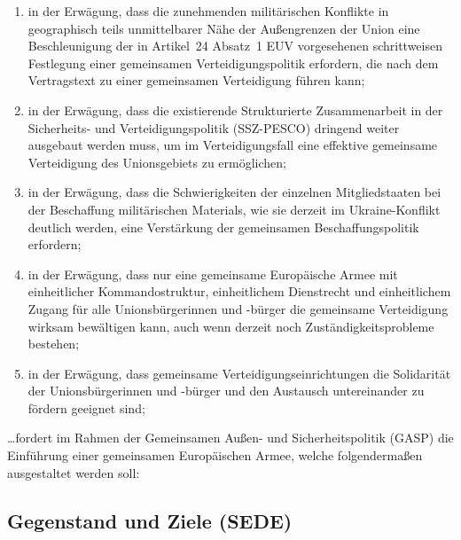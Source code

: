 \documentclass[12pt,a4paper]{article}
\begin{document}
\begin{enumerate}[label=\Alph*., leftmargin=2em, itemsep=8pt]
    \item in der Erwägung, dass die zunehmenden militärischen Konflikte in geographisch
    teils unmittelbarer Nähe der Außengrenzen der Union eine Beschleunigung der in
    Artikel~24 Absatz~1 EUV vorgesehenen schrittweisen Festlegung einer gemeinsamen
    Verteidigungspolitik erfordern, die nach dem Vertragstext zu einer gemeinsamen
    Verteidigung führen kann;

    \item in der Erwägung, dass die existierende Strukturierte Zusammenarbeit in der
    Sicherheits- und Verteidigungspolitik (SSZ-PESCO) dringend weiter ausgebaut werden
    muss, um im Verteidigungsfall eine effektive gemeinsame Verteidigung des
    Unionsgebiets zu ermöglichen;

    \item in der Erwägung, dass die Schwierigkeiten der einzelnen Mitgliedstaaten bei der
    Beschaffung militärischen Materials, wie sie derzeit im Ukraine-Konflikt deutlich
    werden, eine Verstärkung der gemeinsamen Beschaffungspolitik erfordern;

    \item in der Erwägung, dass nur eine gemeinsame Europäische Armee mit einheitlicher
    Kommandostruktur, einheitlichem Dienstrecht und einheitlichem Zugang für alle
    Unionsbürgerinnen und -bürger die gemeinsame Verteidigung wirksam bewältigen kann,
    auch wenn derzeit noch Zuständigkeitsprobleme bestehen;

    \item in der Erwägung, dass gemeinsame Verteidigungseinrichtungen die Solidarität der
    Unionsbürgerinnen und -bürger und den Austausch untereinander zu fördern geeignet
    sind;
\end{enumerate}

\newpage

\noindent\ldots fordert im Rahmen der Gemeinsamen Außen- und Sicherheitspolitik (GASP) die Einführung einer gemeinsamen Europäischen Armee, welche folgendermaßen ausgestaltet werden soll:

\subsection*{Gegenstand und Ziele (SEDE)}
\end{document}
